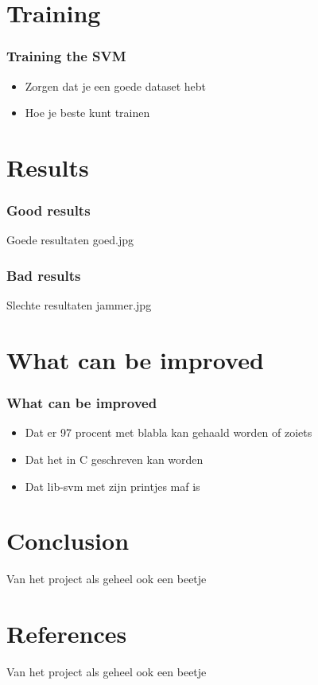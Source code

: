 \documentclass{beamer}
\begin{document}
    \section{Training}

    \begin{frame}
        \frametitle{Training the SVM}
        \begin{itemize}
            \item Zorgen dat je een goede dataset hebt
            \pause
            \item Hoe je beste kunt trainen
        \end{itemize}
    \end{frame}

    \section{Results}

    \begin{frame}
        \frametitle{Good results}
        Goede resultaten goed.jpg
    \end{frame}

    \begin{frame}
        \frametitle{Bad results}
        Slechte resultaten jammer.jpg
    \end{frame}


    \section{What can be improved}

    \begin{frame}
        \frametitle{What can be improved}
        \begin{itemize}
            \item Dat er 97 procent met blabla kan gehaald worden of zoiets
            \pause
            \item Dat het in C geschreven kan worden
            \pause
            \item Dat lib-svm met zijn printjes maf is
        \end{itemize}
    \end{frame}

    \section{Conclusion}
        \begin{frame}
            Van het project als geheel ook een beetje
        \end{frame}

    \section{References}
        \begin{frame}
            Van het project als geheel ook een beetje
        \end{frame}
\end{document}
